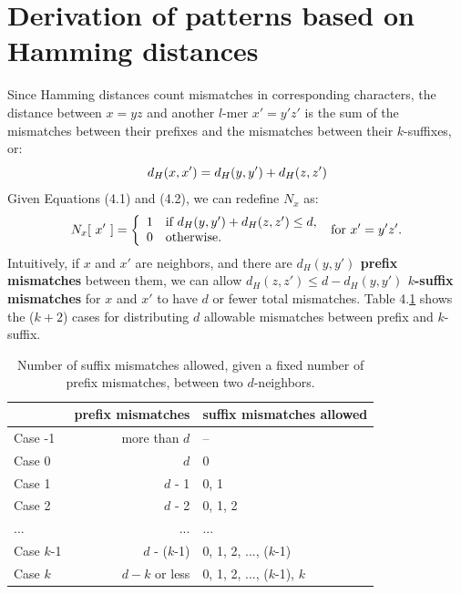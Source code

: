 \documentclass[oneside,12pt]{DISCSthesis}
\begin{document}
{	\section{Derivation of patterns based on Hamming distances}
		\noindent Since Hamming distances count mismatches in corresponding characters, the distance between $x = yz$ and another $l$-mer $x' = y'z'$ is the sum of the mismatches between their prefixes and the mismatches between their $k$-suffixes, or:\vspace*{-4mm} 
		\begin{equation} d_H(x,x') = d_H(y,y') + d_H(z,z')\vspace*{-4mm}\end{equation}
		Given Equations (4.1) and (4.2), we can redefine $N_x$ as:\vspace*{-4mm}
		\begin{equation}
			N_{x}[\ x'\ ] = \left\{
			\begin{array}{rl}
				1 & \text{if } d_H(y,y') + d_H(z,z') \leq d,\\
				0 & \text{otherwise.}
			\end{array} \right.
			\text{ for }x' = y'z'.\vspace*{-4mm}	
			\end{equation}
		Intuitively, if $x$ and $x'$ are neighbors, and there are {\bf\boldmath $d_H(y,y')$  prefix mismatches} between them, we can  allow {\bf\boldmath $d_H(z,z') \leq d - d_H(y,y')$ $k$-suffix mismatches} for $x$ and $x'$ to have $d$ or fewer total mismatches. Table 4.\ref{tbl:cases_prefix_suffix} shows the ($k+2$) cases for distributing $d$ allowable mismatches between prefix and $k$-suffix.\vspace*{3mm}
		\begin{table}[h] \label{tbl:cases_prefix_suffix}
			\centering\renewcommand{\arraystretch}{1.25}
			\begin{tabular}{|l|r|l|}
			\hline
			\bfseries & \bfseries prefix mismatches & \bfseries\boldmath suffix mismatches allowed \\
			\hline
			Case -1 &		more than $d$ 	& --\\
			Case  0 & 		$d$ 			& 0 \\
			Case  1 & 		$d$ - 1 		& 0, 1 \\
			Case  2 & 		$d$ - 2 		& 0, 1, 2 \\
			... & ...& ...\\
			Case  $k$-1 & 	$d$ - ($k$-1) 	& 0, 1, 2, ..., ($k$-1) \\
			Case  $k$ & 	$d-k$ or less 	& 0, 1, 2, ..., ($k$-1), $k$ \\
			\hline
			\end{tabular}
			\caption{Number of suffix mismatches allowed, given a fixed number of prefix mismatches, between two $d$-neighbors.}
			\end{table}
		
}
\end{document}
